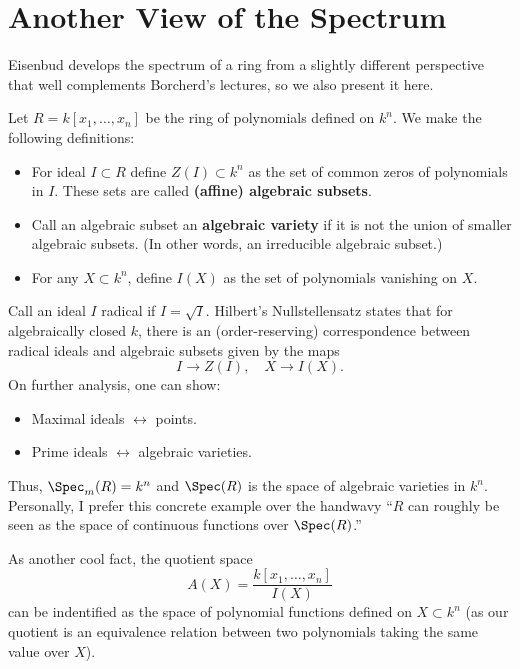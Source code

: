 \section{Another View of the Spectrum}

Eisenbud develops the spectrum of a ring from a slightly different perspective that well complements Borcherd's lectures, so we also present it here.

Let $R = k[x_1, \dots, x_n]$ be the ring of polynomials defined on $k^n$. We make the following definitions:
\begin{itemize}
    \item For ideal $I \subset R$ define $Z(I) \subset k^n$ as the set of common zeros of polynomials in $I$. These sets are called \textbf{(affine) algebraic subsets}.
    \item Call an algebraic subset an \textbf{algebraic variety} if it is not the union of smaller algebraic subsets. (In other words, an irreducible algebraic subset.)
    \item For any $X \subset k^n$, define $I(X)$ as the set of polynomials vanishing on $X$.
\end{itemize}
Call an ideal $I$ radical if $I = \sqrt{I}$. Hilbert's Nullstellensatz states that for algebraically closed $k$, there is an (order-reserving) correspondence between radical ideals and algebraic subsets given by the maps
\[
    I \to Z(I), \quad X \to I(X).
\]
On further analysis, one can show:
\begin{itemize}
    \item Maximal ideals $\leftrightarrow$ points.
    \item Prime ideals $\leftrightarrow$ algebraic varieties.
\end{itemize}
Thus, $\Spec_m(R) = k^n$ and $\Spec(R)$ is the space of algebraic varieties in $k^n$. Personally, I prefer this concrete example over the handwavy ``$R$ can roughly be seen as the space of continuous functions over $\Spec(R)$.''

As another cool fact, the quotient space
\[
    A(X) = \frac{k[x_1, \dots, x_n]}{I(X)}
\]
can be indentified as the space of polynomial functions defined on $X \subset k^n$ (as our quotient is an equivalence relation between two polynomials taking the same value over $X$).


